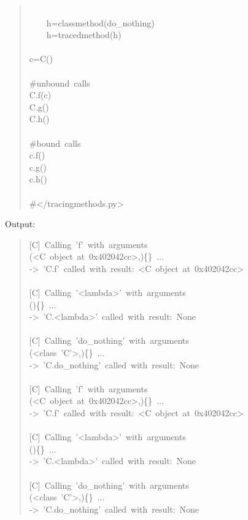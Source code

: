 \documentclass[10pt,english]{article}
\begin{document}
\begin{quote}
\begin{ttfamily}
\begin{flushleft}
\mbox{}\\
\mbox{~~~~h=classmethod(do{\_}nothing)}\\
\mbox{~~~~h=tracedmethod(h)}\\
\mbox{}\\
\mbox{c=C()}\\
\mbox{}\\
\mbox{{\#}unbound~calls}\\
\mbox{C.f(c)~}\\
\mbox{C.g()}\\
\mbox{C.h()}\\
\mbox{}\\
\mbox{{\#}bound~calls}\\
\mbox{c.f()~~}\\
\mbox{c.g()}\\
\mbox{c.h()}\\
\mbox{}\\
\mbox{{\#}</tracingmethods.py>}
\end{flushleft}\end{ttfamily}
\end{quote}

Output:
\begin{quote}
\begin{ttfamily}\begin{flushleft}
\mbox{[C]~Calling~'f'~with~arguments}\\
\mbox{(<C~object~at~0x402042cc>,){\{}{\}}~...}\\
\mbox{->~'C.f'~called~with~result:~<C~object~at~0x402042cc>}\\
\mbox{}\\
\mbox{[C]~Calling~'<lambda>'~with~arguments}\\
\mbox{(){\{}{\}}~...}\\
\mbox{->~'C.<lambda>'~called~with~result:~None}\\
\mbox{}\\
\mbox{[C]~Calling~'do{\_}nothing'~with~arguments}\\
\mbox{(<class~'C'>,){\{}{\}}~...}\\
\mbox{->~'C.do{\_}nothing'~called~with~result:~None}\\
\mbox{}\\
\mbox{[C]~Calling~'f'~with~arguments}\\
\mbox{(<C~object~at~0x402042cc>,){\{}{\}}~...}\\
\mbox{->~'C.f'~called~with~result:~<C~object~at~0x402042cc>}\\
\mbox{}\\
\mbox{[C]~Calling~'<lambda>'~with~arguments}\\
\mbox{(){\{}{\}}~...}\\
\mbox{->~'C.<lambda>'~called~with~result:~None}\\
\mbox{}\\
\mbox{[C]~Calling~'do{\_}nothing'~with~arguments}\\
\mbox{(<class~'C'>,){\{}{\}}~...}\\
\mbox{->~'C.do{\_}nothing'~called~with~result:~None}
\end{flushleft}\end{ttfamily}
\end{quote}
\end{document}
